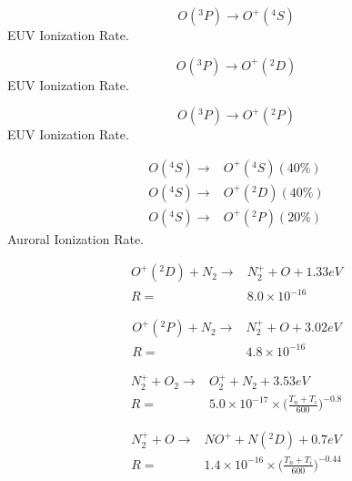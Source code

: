 \documentclass[twoside,10pt]{book}
\begin{document}
\begin{equation}
O(^3P) \rightarrow O^+(^4S)
\end{equation}
EUV Ionization Rate.

\begin{equation}
O(^3P) \rightarrow O^+(^2D)
\end{equation}
EUV Ionization Rate.

\begin{equation}
O(^3P) \rightarrow O^+(^2P)
\end{equation}
EUV Ionization Rate.

\begin{equation}
\begin{split}
O(^4S) \rightarrow & O^+(^4S) (40\%) \\
O(^4S) \rightarrow & O^+(^2D) (40\%) \\
O(^4S) \rightarrow & O^+(^2P) (20\%)
\end{split}
\end{equation}
Auroral Ionization Rate.

\begin{equation}
\begin{split}
O^+(^2D) + N_2 \rightarrow & N_2^+ + O + 1.33 eV \\
R = & 8.0\times 10^{-16}
\end{split}
\end{equation}

\begin{equation}
\begin{split}
O^+(^2P) + N_2 \rightarrow & N_2^+ + O + 3.02 eV \\
R = & 4.8\times 10^{-16}
\end{split}
\end{equation}

\begin{equation}
\begin{split}
N_2^+ + O_2 \rightarrow & O_2^+ + N_2 + 3.53 eV \\
R = & 5.0\times 10^{-17} \times \bigg(\frac{T_n+T_i}{600}\bigg)^{-0.8}
\end{split}
\end{equation}

\begin{equation}
\begin{split}
N_2^+ + O \rightarrow & NO^+ + N(^2D) + 0.7 eV \\
R = & 1.4\times 10^{-16} \times \bigg(\frac{T_n+T_i}{600}\bigg)^{-0.44}
\end{split}
\end{equation}
\end{document}
